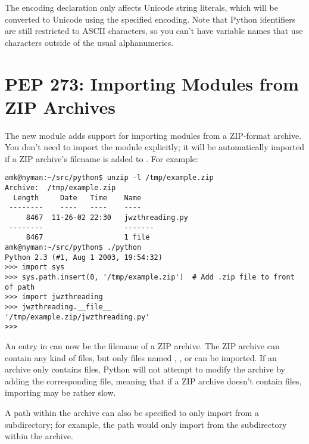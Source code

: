 \documentclass{howto}
\begin{document}
The encoding declaration only affects Unicode string literals, which
will be converted to Unicode using the specified encoding.  Note that
Python identifiers are still restricted to ASCII characters, so you
can't have variable names that use characters outside of the usual
alphanumerics.

\begin{seealso}


\end{seealso}


\section{PEP 273: Importing Modules from ZIP Archives}

The new  module adds support for importing
modules from a ZIP-format archive.  You don't need to import the
module explicitly; it will be automatically imported if a ZIP
archive's filename is added to .  For example:

\begin{verbatim}
amk@nyman:~/src/python$ unzip -l /tmp/example.zip
Archive:  /tmp/example.zip
  Length     Date   Time    Name
 --------    ----   ----    ----
     8467  11-26-02 22:30   jwzthreading.py
 --------                   -------
     8467                   1 file
amk@nyman:~/src/python$ ./python
Python 2.3 (#1, Aug 1 2003, 19:54:32) 
>>> import sys
>>> sys.path.insert(0, '/tmp/example.zip')  # Add .zip file to front of path
>>> import jwzthreading
>>> jwzthreading.__file__
'/tmp/example.zip/jwzthreading.py'
>>>
\end{verbatim}

An entry in  can now be the filename of a ZIP archive.
The ZIP archive can contain any kind of files, but only files named
, , or  can be imported.  If an
archive only contains  files, Python will not attempt to
modify the archive by adding the corresponding  file, meaning
that if a ZIP archive doesn't contain  files, importing may be
rather slow.

A path within the archive can also be specified to only import from a
subdirectory; for example, the path 
would only import from the  subdirectory within the
archive.
\end{document}
